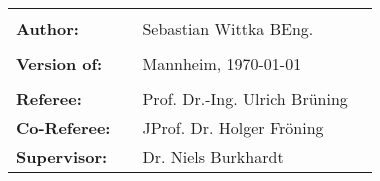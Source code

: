 





\vfil
\begin{table}[htb]
\centering
\begin{tabular}{llll}
& & \\
\textbf{Author:} & & Sebastian Wittka BEng. &
\\
& & \\
\textbf{Version of:} & & Mannheim, \today &\\
& & \\
\textbf{Referee:} & & Prof. Dr.-Ing. Ulrich Brüning &\\
\textbf{Co-Referee:} & & JProf. Dr. Holger Fröning &\\
\textbf{Supervisor:} & & Dr. Niels Burkhardt &\\
\end{tabular}
\end{table}